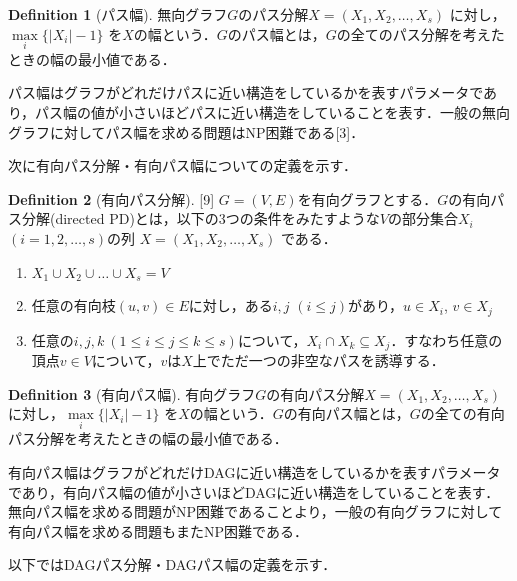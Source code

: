 \documentclass[master]{kuisthesis}		%
\theoremstyle{plain}
\theoremstyle{definition}
\newtheorem{definition*}{Definition}
\begin{document}
\begin{definition*}[パス幅]
    無向グラフ$G$のパス分解$X=(X_1, X_2,   \dots, X_s)$ に対し，$ \underset{i}{\max} \{ |X_i|-1 \}$ を$X$の幅という．$G$のパス幅とは，$G$の全てのパス分解を考えたときの幅の最小値である．
\end{definition*}

パス幅はグラフがどれだけパスに近い構造をしているかを表すパラメータであり，パス幅の値が小さいほどパスに近い構造をしていることを表す．一般の無向グラフに対してパス幅を求める問題はNP困難である[3]．


 
次に有向パス分解・有向パス幅についての定義を示す．

\begin{definition*}[有向パス分解][9]
    $G=(V, E)$を有向グラフとする．$G$の有向パス分解(directed PD)とは，以下の3つの条件をみたすような$V$の部分集合$X_i$ $(i = 1, 2,  \dots, s)$の列 $X=(X_1, X_2,  \dots, X_s)$ である．
    
    \begin{enumerate}
        \item $ X_1 \cup X_2 \cup \dots \cup X_s = V $ 
        \item 任意の有向枝$(u, v) \in E$に対し，ある$i, j$ $(i \leq j)$があり，$u \in X_i$, $v \in X_j$
        \item 任意の$ i, j, k\ (1 \leq i \leq j \leq k \leq s)$について，$X_i \cap X_k \subseteq X_j$．すなわち任意の頂点$v \in V$について，$v$は$X$上でただ一つの非空なパスを誘導する．
    \end{enumerate}
\end{definition*}


\begin{definition*}[有向パス幅]
    有向グラフ$G$の有向パス分解$X=(X_1, X_2,   \dots, X_s)$に対し，$ \underset{i}{\max} \{ |X_i|-1 \}$ を$X$の幅という．$G$の有向パス幅とは，$G$の全ての有向パス分解を考えたときの幅の最小値である．
\end{definition*}

有向パス幅はグラフがどれだけDAGに近い構造をしているかを表すパラメータであり，有向パス幅の値が小さいほどDAGに近い構造をしていることを表す．無向パス幅を求める問題がNP困難であることより，一般の有向グラフに対して有向パス幅を求める問題もまたNP困難である．






以下ではDAGパス分解・DAGパス幅の定義を示す．
\end{document}

